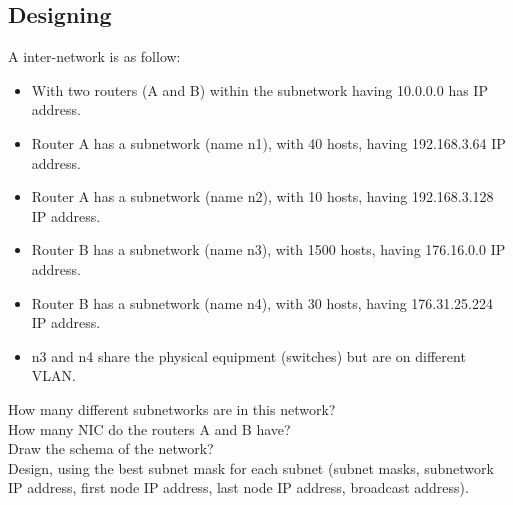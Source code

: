 \documentclass[11pt]{article}
\begin{document}
\subsection{Designing}
A inter-network is as follow:
\begin{itemize}
  \item With two routers (A and B) within the subnetwork having 10.0.0.0 has IP address.
  \item Router A has a subnetwork (name n1), with 40 hosts, having 192.168.3.64 IP address.
  \item Router A has a subnetwork (name n2), with 10 hosts, having 192.168.3.128 IP address.
  \item Router B has a subnetwork (name n3), with 1500 hosts, having 176.16.0.0 IP address.
  \item Router B has a subnetwork (name n4), with 30 hosts, having 176.31.25.224 IP address.
  \item n3 and n4 share the physical equipment (switches) but are on different VLAN.
\end{itemize}

How many different subnetworks are in this network?\\
How many NIC do the routers A and B have?\\
Draw the schema of the network?\\
Design, using the best subnet mask for each subnet (subnet masks, subnetwork IP address, first node IP address, last node IP address, broadcast address).
\end{document}
